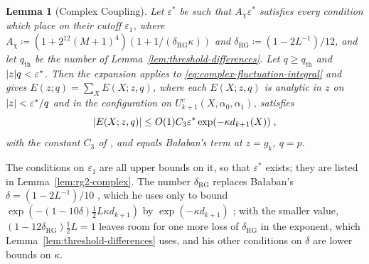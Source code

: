 \documentclass[11pt]{preprint}
\DeclarePairedDelimiter{\abs}{\lvert}{\rvert}
\numberwithin{equation}{section}
\newtheorem{lemma}{Lemma}[section]
\theoremstyle{definition}
\theoremstyle{remark}
\theoremstyle{plain}
\begin{document}
\begin{lemma}[Complex Coupling]\label{lem:complex-coupling}
Let $\varepsilon^*$ be such that $A_\chi\varepsilon^*$ satisfies every condition which \cite{BalabanRG1,BalabanRG2} place on their cutoff $\varepsilon_1$, where $A_\chi \coloneqq (1 + 2^{12}(M + 1)^4)(1 + 1/(\delta_{\mathrm{RG}}\kappa))$ and $\delta_{\mathrm{RG}} \coloneqq (1 - 2L^{-1})/12$, and let $q_{\mathrm{th}}$ be the number of Lemma~\ref{lem:threshold-differences}. Let $q \geq q_{\mathrm{th}}$ and $\abs{z}q < \varepsilon^*$. Then the expansion \cite[(2.1)--(2.13), pp.~12--14]{BalabanRG2} applies to \eqref{eq:complex-fluctuation-integral} and gives $E(z; q) = \sum_XE(X; z, q)$, where each $E(X; z, q)$ is analytic in $z$ on $\abs{z} < \varepsilon^*/q$ and in the configuration on $U^c_{k+1}(X, \alpha_0, \alpha_1)$, satisfies
\begin{equation}\label{eq:complex-step-bound}
    \abs{E(X; z, q)} \leq O(1)C_3\varepsilon^*\exp(-\kappa d_{k+1}(X))\;,
\end{equation}
with the constant $C_3$ of \cite[p.~20]{BalabanRG2}, and equals Ba{\l}aban's term at $z = g_k$, $q = p$.
\end{lemma}

The conditions on $\varepsilon_1$ are all upper bounds on it, so that $\varepsilon^*$ exists; they are listed in Lemma~\ref{lem:rg2-complex}. The number $\delta_{\mathrm{RG}}$ replaces Ba{\l}aban's $\delta = (1 - 2L^{-1})/10$ \cite[p.~21]{BalabanRG2}, which he uses only to bound $\exp(-(1 - 10\delta)\frac12L\kappa d_{k+1})$ by $\exp(-\kappa d_{k+1})$ \cite[(2.41), p.~21]{BalabanRG2}; with the smaller value, $(1 - 12\delta_{\mathrm{RG}})\frac12L = 1$ leaves room for one more loss of $\delta_{\mathrm{RG}}$ in the exponent, which Lemma~\ref{lem:threshold-differences} uses, and his other conditions on $\delta$ are lower bounds on $\kappa$.
\end{document}
